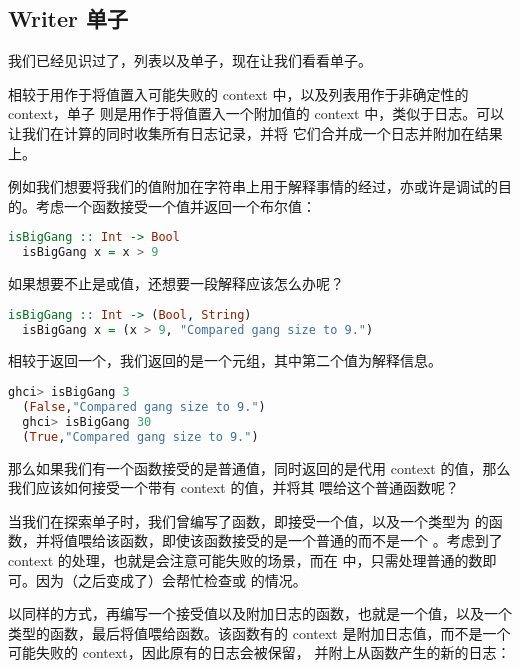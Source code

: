 \documentclass[./main.tex]{subfiles}
\begin{document}
\subsection*{Writer 单子}

我们已经见识过了，列表以及单子，现在让我们看看单子。

相较于用作于将值置入可能失败的 context 中，以及列表用作于非确定性的 context，单子
则是用作于将值置入一个附加值的 context 中，类似于日志。可以让我们在计算的同时收集所有日志记录，并将
它们合并成一个日志并附加在结果上。

例如我们想要将我们的值附加在字符串上用于解释事情的经过，亦或许是调试的目的。考虑一个函数接受一个值并返回一个布尔值：

\begin{lstlisting}[language=Haskell]
  isBigGang :: Int -> Bool
  isBigGang x = x > 9
\end{lstlisting}

如果想要不止是或值，还想要一段解释应该怎么办呢？

\begin{lstlisting}[language=Haskell]
  isBigGang :: Int -> (Bool, String)
  isBigGang x = (x > 9, "Compared gang size to 9.")
\end{lstlisting}

相较于返回一个，我们返回的是一个元组，其中第二个值为解释信息。

\begin{lstlisting}[language=Haskell]
  ghci> isBigGang 3
  (False,"Compared gang size to 9.")
  ghci> isBigGang 30
  (True,"Compared gang size to 9.")
\end{lstlisting}

那么如果我们有一个函数接受的是普通值，同时返回的是代用 context 的值，那么我们应该如何接受一个带有 context 的值，并将其
喂给这个普通函数呢？

当我们在探索单子时，我们曾编写了函数，即接受一个值，以及一个类型为
的函数，并将值喂给该函数，即使该函数接受的是一个普通的而不是一个
。考虑到了 context 的处理，也就是会注意可能失败的场景，而在
中，只需处理普通的数即可。因为（之后变成了\acode{>>=}）会帮忙检查或
的情况。

以同样的方式，再编写一个接受值以及附加日志的函数，也就是一个值，以及一个
类型的函数，最后将值喂给函数。该函数有的 context 是附加日志值，而不是一个可能失败的 context，因此原有的日志会被保留，
并附上从函数产生的新的日志：
\end{document}
